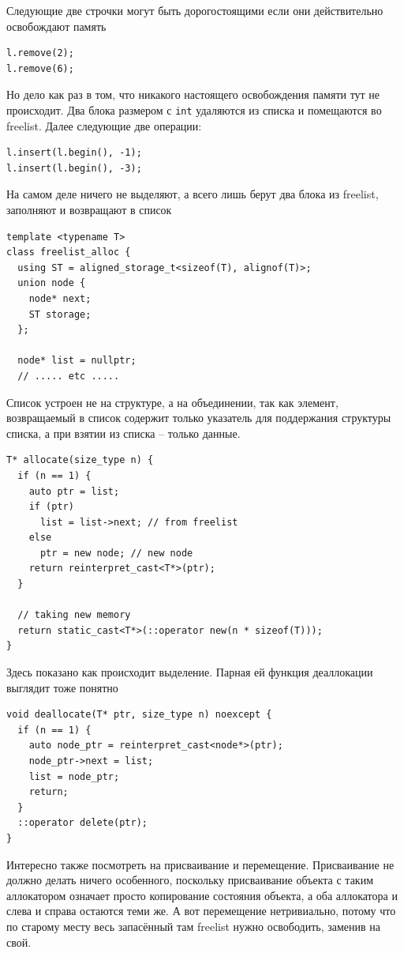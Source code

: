 \documentclass[a4paper,12pt,oneside]{book}
\begin{document}
Следующие две строчки могут быть дорогостоящими если они действительно освобождают память

\begin{lstlisting}
l.remove(2); 
l.remove(6);
\end{lstlisting}

Но дело как раз в том, что никакого настоящего освобождения памяти тут не происходит. Два блока размером с \lstinline!int! удаляются из списка и помещаются во freelist. Далее следующие две операции:

\begin{lstlisting}
l.insert(l.begin(), -1);
l.insert(l.begin(), -3);
\end{lstlisting}

На самом деле ничего не выделяют, а всего лишь берут два блока из freelist, заполняют и возвращают в список

\begin{lstlisting}
template <typename T>
class freelist_alloc {
  using ST = aligned_storage_t<sizeof(T), alignof(T)>;
  union node {
    node* next;
    ST storage;
  };

  node* list = nullptr;
  // ..... etc .....
\end{lstlisting}

Список устроен не на структуре, а на объединении, так как элемент, возвращаемый в список содержит только указатель для поддержания структуры списка, а при взятии из списка -- только данные.

\begin{lstlisting}
T* allocate(size_type n) {
  if (n == 1) {
    auto ptr = list;
    if (ptr)
      list = list->next; // from freelist
    else
      ptr = new node; // new node
    return reinterpret_cast<T*>(ptr);
  }

  // taking new memory
  return static_cast<T*>(::operator new(n * sizeof(T)));
}
\end{lstlisting}

Здесь показано как происходит выделение. Парная ей функция деаллокации выглядит тоже понятно

\begin{lstlisting}
void deallocate(T* ptr, size_type n) noexcept {
  if (n == 1) {
    auto node_ptr = reinterpret_cast<node*>(ptr);
    node_ptr->next = list;
    list = node_ptr;
    return;
  } 
  ::operator delete(ptr);
}
\end{lstlisting}

Интересно также посмотреть на присваивание и перемещение. Присваивание не должно делать ничего особенного, поскольку присваивание объекта с таким аллокатором означает просто копирование состояния объекта, а оба аллокатора и слева и справа остаются теми же. А вот перемещение нетривиально, потому что по старому месту весь запасённый там freelist нужно освободить, заменив на свой.
\end{document}
